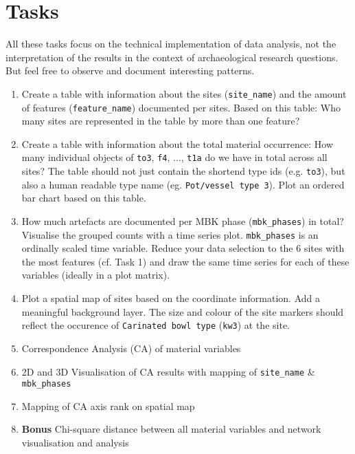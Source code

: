 \documentclass[a3, ruledsections, 8pt]{sciposter}
\begin{document}
\pagebreak

\section{Tasks}

All these tasks focus on the technical implementation of data analysis, not the interpretation of the results in the context of archaeological research questions. But feel free to observe and document interesting patterns.

\begin{enumerate}
\item Create a table with information about the sites (\verb|site_name|) and the amount of features (\verb|feature_name|) documented per sites. Based on this table: Who many sites are represented in the table by more than one feature? 
\item Create a table with information about the total material occurrence: How many individual objects of \verb|to3|, \verb|f4|, ..., \verb|t1a| do we have in total across all sites? The table should not just contain the shortend type ids (e.g. \verb|to3|), but also a human readable type name (eg. \verb|Pot/vessel type 3|). Plot an ordered bar chart based on this table.
\item How much artefacts are documented per MBK phase (\verb|mbk_phases|) in total? Visualise the grouped counts with a time series plot. \verb|mbk_phases| is an ordinally scaled time variable. Reduce your data selection to the 6 sites with the most features (cf. Task 1) and draw the same time series for each of these variables (ideally in a plot matrix).
\item Plot a spatial map of sites based on the coordinate information. Add a meaningful background layer. The size and colour of the site markers should reflect the occurence of \verb|Carinated bowl type| (\verb|kw3|) at the site.
\item Correspondence Analysis (CA) of material variables
\item 2D and 3D Visualisation of CA results with mapping of \verb|site_name| \& \verb|mbk_phases|
\item Mapping of CA axis rank on spatial map
\item \textbf{Bonus} Chi-square distance between all material variables and network visualisation and analysis
\end{enumerate}


\end{document}
